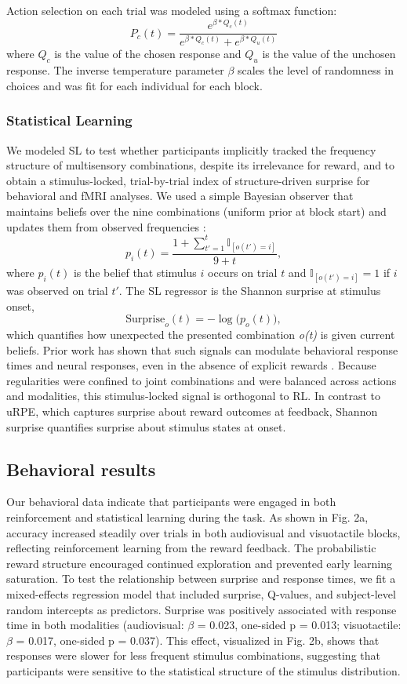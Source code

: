 \documentclass{article}
\begin{document}
Action selection on each trial was modeled using a softmax function:
\[P_c(t) =  \dfrac{e^{\beta*Q_c(t)}}{e^{\beta*Q_c(t)}+e^{\beta*Q_u(t)}}\] where $Q_c$ is the value of the chosen response and $Q_u$ is the value of the unchosen response. The inverse temperature parameter $\beta$ scales the level of randomness in choices and was fit for each individual for each block.

\subsubsection*{Statistical Learning}

We modeled SL to test whether participants implicitly tracked the frequency structure of multisensory combinations, despite its irrelevance for reward, and to obtain a stimulus-locked, trial-by-trial index of structure-driven surprise for behavioral and fMRI analyses. We used a simple Bayesian observer that maintains beliefs over the nine combinations (uniform prior at block start) and updates them from observed frequencies \cite{bornstein2012dissociating, otto2013curse, konovalov2016gaze, konovalov2018neurocomputational}:
\[
p_i(t) = \frac{1 + \sum_{t'=1}^{t} \mathbb{I}_{[o(t') = i]}}{9 + t},
\]
where $p_i(t)$ is the belief that stimulus $i$ occurs on trial $t$ and $\mathbb{I}_{[o(t') = i]}=1$ if $i$ was observed on trial $t'$. The SL regressor is the Shannon surprise at stimulus onset,
\[
\text{Surprise}_o(t) = -\log\big(p_o(t)\big),
\]
which quantifies how unexpected the presented combination \textit{o(t)} is given current beliefs. Prior work has shown that such signals can modulate behavioral response times and neural responses, even in the absence of explicit rewards \cite{konovalov2018neurocomputational}. Because regularities were confined to joint combinations and were balanced across actions and modalities, this stimulus-locked signal is orthogonal to RL. In contrast to uRPE, which captures surprise about reward outcomes at feedback, Shannon surprise quantifies surprise about stimulus states at onset.

\subsection*{Behavioral results}

Our behavioral data indicate that participants were engaged in both reinforcement and statistical learning during the task. As shown in Fig. 2a, accuracy increased steadily over trials in both audiovisual and visuotactile blocks, reflecting reinforcement learning from the reward feedback. The probabilistic reward structure encouraged continued exploration and prevented early learning saturation. To test the relationship between surprise and response times, we fit a mixed-effects regression model that included surprise, Q-values, and subject-level random intercepts as predictors. Surprise was positively associated with response time in both modalities (audiovisual: $\beta$ = 0.023, one-sided p = 0.013; visuotactile: $\beta$ = 0.017, one-sided p = 0.037). This effect, visualized in Fig. 2b, shows that responses were slower for less frequent stimulus combinations, suggesting that participants were sensitive to the statistical structure of the stimulus distribution.
\end{document}
